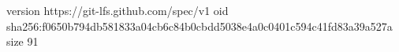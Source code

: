 version https://git-lfs.github.com/spec/v1
oid sha256:f0650b794db581833a04cb6c84b0cbdd5038e4a0c0401c594c41fd83a39a527a
size 91
